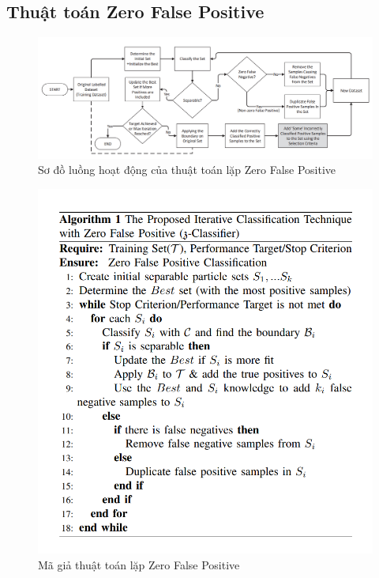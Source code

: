 \documentclass[./../main.tex]{subfiles}
\begin{document}
\subsection{Thuật toán Zero False Positive}
\begin{figure}[ht!]
	\includegraphics[width=\linewidth]{./images/zfp_flow_chart.png}
	\caption{Sơ đồ luồng hoạt động của thuật toán lặp Zero False Positive \cite{zfp}}
	\label{fig:zfp_flow_chart}
\end{figure}

\begin{figure}[ht!]
	\includegraphics[width=\linewidth]{./images/algorithm_zfp.png}
	\caption{Mã giả thuật toán lặp Zero False Positive \cite{zfp}}
	\label{fig:algorithm}
\end{figure}
\end{document}
